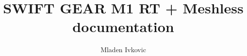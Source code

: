 



\newcommand{\deprecated}[1]{\textcolor{red}{NOTE: DEPRECATED \$\$ }\textcolor{gray}{\textit{#1}} \textcolor{red}{\$\$}}


\title{SWIFT GEAR M1 RT + Meshless documentation}
\author{Mladen Ivkovic}
\date{}










\maketitle
\tableofcontents
\clearpage







% 












\appendix{}






